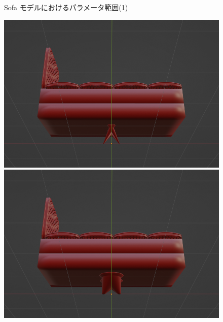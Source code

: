 \begin{figure}[h]
\begin{minipage}[b]{0.48\linewidth}
 \end{minipage}
 \caption{Sofa モデルにおけるパラメータ範囲(1)}\label{fig:sofaParamMean_1}
\end{figure}


\begin{figure}[h]
 \begin{minipage}[b]{0.48\linewidth}
  \centering
  \includegraphics[scale=0.17]{./imgs/sofaParamMean/legDiameterMin.png}
 \end{minipage}
 \begin{minipage}[b]{0.48\linewidth}
  \centering
  \includegraphics[scale=0.17]{./imgs/sofaParamMean/legDiameterMax.png}
 \end{minipage}\\

\end{figure}
